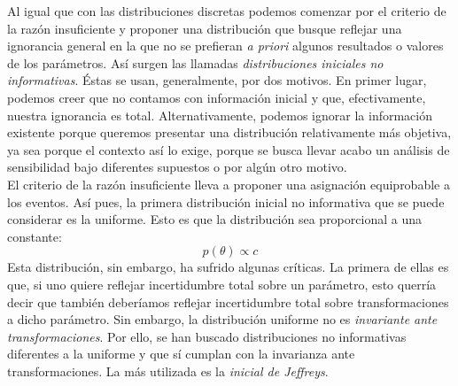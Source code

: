 Al igual que con las distribuciones discretas podemos comenzar por el criterio de la razón insuficiente y proponer una distribución que busque reflejar una ignorancia general en la que no se prefieran \textit{a priori} algunos resultados o valores de los parámetros. Así surgen las llamadas \textit{distribuciones iniciales no informativas}. Éstas se usan, generalmente, por dos motivos. En primer lugar, podemos creer que no contamos con información inicial y que, efectivamente, nuestra ignorancia es total. Alternativamente, podemos ignorar la información existente porque queremos presentar una distribución relativamente más objetiva, ya sea porque el contexto así lo exige, porque se busca llevar acabo un análisis de sensibilidad bajo diferentes supuestos o por algún otro motivo.\\ 

El criterio de la razón insuficiente lleva a proponer una asignación equiprobable a los eventos. Así pues, la primera distribución inicial no informativa que se puede considerar es la uniforme. Esto es que la distribución sea proporcional a una constante:
\begin{equation*}
p(\theta) \propto c
\end{equation*}
Esta distribución, sin embargo, ha sufrido algunas críticas. La primera de ellas es que, si uno quiere reflejar incertidumbre total sobre un parámetro, esto querría decir que también deberíamos reflejar incertidumbre total sobre transformaciones a dicho parámetro. Sin embargo, la distribución uniforme no es \textit{invariante ante transformaciones}. Por ello, se han buscado distribuciones no informativas diferentes a la uniforme y que sí cumplan con la invarianza ante transformaciones. La más utilizada es la \textit{inicial de Jeffreys}. 

